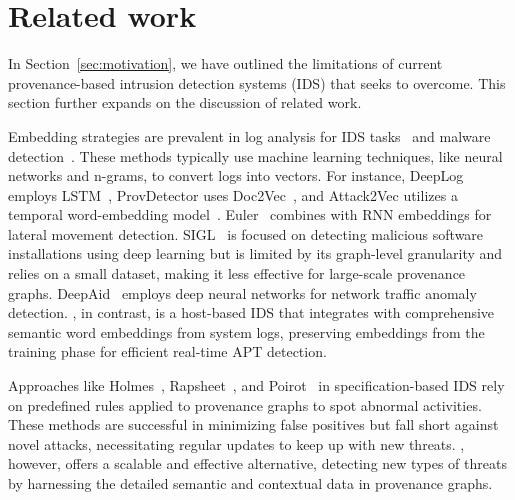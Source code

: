 \section{Related work}
\label{s:relwk}
In Section~\ref{sec:motivation}, we have outlined the limitations of current provenance-based intrusion detection systems (IDS) that \Sys seeks to overcome. This section further expands on the discussion of related work.

 Embedding strategies are prevalent in log analysis for IDS tasks~\cite{aljawarneh2018anomaly, maseer2021benchmarking, gyanchandani2012taxonomy,atlas} and malware detection~\cite{zolkipli2011approach, chakkaravarthy2019survey, isohara2011kernel}. These methods typically use machine learning techniques, like neural networks and n-grams, to convert logs into vectors. For instance, DeepLog employs LSTM~\cite{deeplog2017}, ProvDetector uses Doc2Vec~\cite{provdetector2020, le2014distributed}, and Attack2Vec utilizes a temporal word-embedding model~\cite{shen2019attack2vec}. Euler~\cite{king2022euler} combines \gnnshort with RNN embeddings for lateral movement detection. SIGL~\cite{sigl} is focused on detecting malicious software installations using deep learning but is limited by its graph-level granularity and relies on a small dataset, making it less effective for large-scale provenance graphs. DeepAid~\cite{deepaid} employs deep neural networks for network traffic anomaly detection. \Sys, in contrast, is a host-based IDS that integrates \gnnshort with comprehensive semantic word embeddings from system logs, preserving embeddings from the training phase for efficient real-time APT detection.

 Approaches like Holmes~\cite{holmes2019}, Rapsheet~\cite{rapsheet2020}, and Poirot~\cite{poirot2019} in specification-based IDS rely on predefined rules applied to provenance graphs to spot abnormal activities. These methods are successful in minimizing false positives but fall short against novel attacks, necessitating regular updates to keep up with new threats. \Sys, however, offers a scalable and effective alternative, detecting new types of threats by harnessing the detailed semantic and contextual data in provenance graphs.

